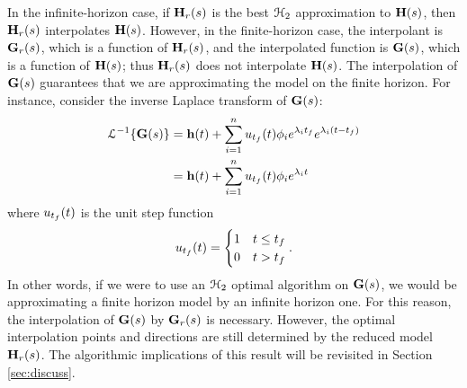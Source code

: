 \documentclass[twocolumn]{autart}
\begin{document}
\begin{remark}
{\color{red} In the infinite-horizon case, if  $\mathbf{H}_r(s)$ is the best $\EuScript{H}_2$ approximation to $\mathbf{H}(s)$, then $\mathbf{H}_r(s)$ interpolates $\mathbf{H}(s)$. However, in the finite-horizon case, 
the interpolant is $\mathbf{G}_r(s)$, which is a function of $\mathbf{H}_r(s)$, and the interpolated function is $\mathbf{G}(s)$, which is a function of $\mathbf{H}(s)$; thus $\mathbf{H}_r(s)$ does not interpolate $\mathbf{H}(s)$. The interpolation of $\mathbf{G}(s)$ guarantees that we are approximating the model on the finite horizon. For instance, consider the inverse Laplace transform of $\mathbf{G}(s)$:
\begin{align*}
\EuScript{L}^{-1}\{\mathbf{G}(s)\}&=\mathbf{h}(t)+\sum_{i=1}^n u_{t_f}(t)\phi_i e^{\lambda_i {t_f}}e^{\lambda_i (t-{t_f})}\\
&=\mathbf{h}(t)+\sum_{i=1}^n u_{t_f}(t)\phi_i e^{\lambda_i t}
\end{align*}
where $u_{t_f}(t)$ is the unit step function
\begin{align*}
u_{t_f}(t)=
 \begin{cases} 
      1 &    t\leq {t_f} \\    
      0 &    t > {t_f} 
   \end{cases}.
\end{align*}
In other words, if we were to use an $\EuScript{H}_2$ optimal algorithm on $\mathbf{G}(s)$, we would be approximating a finite horizon model by an infinite horizon one. For this reason, the interpolation of $\mathbf{G}(s)$ by $\mathbf{G}_r(s)$ is necessary. 
However, the optimal interpolation points  and directions are still determined by the reduced model $\mathbf{H}_r(s)$. The algorithmic implications of this result will be revisited in Section \ref{sec:discuss}.}
\end{remark}
\end{document}

